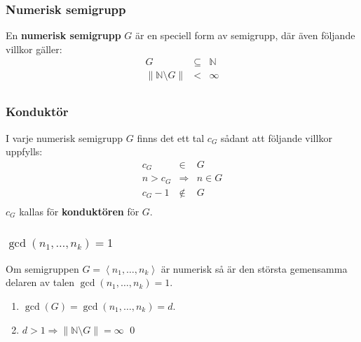 \documentclass{beamer}
\begin{document}
\begin{frame}
	\frametitle{Numerisk semigrupp}
\begin{Definition}
	En \textbf{numerisk semigrupp} $G$ är en speciell form av semigrupp, där även följande villkor gäller:
	\[
	\begin{array}{rcl}
	G & \subseteq & \mathbb{N} \\
	\left\| \mathbb{N} \setminus G \right\| & < & \infty \\
	\end{array}\]
\end{Definition}

\end{frame}

\begin{frame}
	\frametitle{Konduktör}
\begin{Definition}
	I varje numerisk semigrupp $G$ finns det ett tal $c_G$ sådant att följande villkor uppfylls:
	\[\begin{array}{rcl}
	c_G & \in & G \\
	n > c_G & \Longrightarrow & n \in G \\
	c_G - 1 & \notin & G \\
	\end{array}\]
	$c_G$ kallas för \textbf{konduktören} för $G$.
\end{Definition}
\end{frame}

\begin{frame}
	\frametitle{$\gcd(n_1, \ldots, n_k) = 1$}
\begin{Theorem}
	Om semigruppen $G = \left<n_1, \ldots, n_k\right>$ är numerisk så är den största gemensamma delaren av talen $\gcd(n_1, \ldots, n_k) = 1$.
\end{Theorem}

\begin{enumerate}
	\item<3-> $\gcd(G)=\gcd(n_1,\ldots,n_k)=d$.
	\item<4-> $d>1 \Longrightarrow \left\|\mathbb{N} \setminus G \right\| = \infty$
	\qed
\end{enumerate}
\end{frame}
\end{document}
